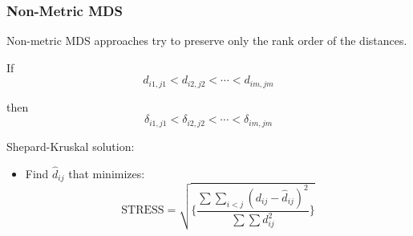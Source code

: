 \documentclass{beamer}
\begin{document}
\begin{frame}
  \frametitle{Non-Metric MDS}

Non-metric MDS approaches try to preserve only the rank order of the distances.

If
\[
d_{i1,j1} < d_{i2,j2} < \cdots< d_{im,jm}
\]

then
\[
\delta_{i1,j1} < \delta_{i2,j2} < \cdots< \delta_{im,jm}
\]

Shepard-Kruskal solution:

\begin{itemize}
\item Find $\hat{d}_{ij}$ that minimizes:
\[
\mbox{STRESS} = \sqrt{ \{ \frac{\sum \sum_{i < j}(d_{ij}-\hat{d}_{ij})^2 }{\sum \sum d_{ij}^2} \} }
\]
\end{itemize}

\bigskip

\end{frame}
\end{document}
